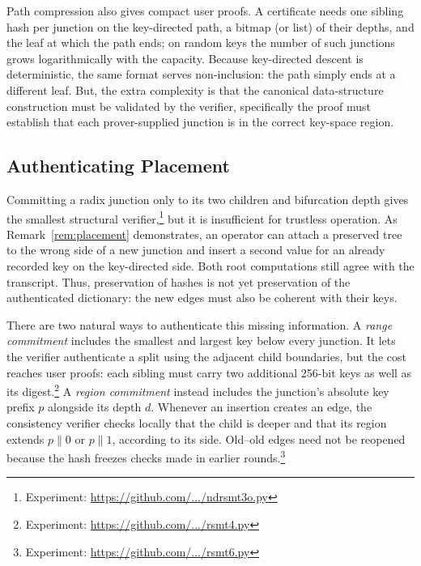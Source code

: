\documentclass[twocolumn]{article}
\begin{document}
Path compression also gives compact user proofs. A certificate needs one sibling hash per junction on the key-directed path, a bitmap (or list) of their depths, and the leaf at which the path ends; on random keys the number of such junctions grows logarithmically with the capacity. Because key-directed descent is deterministic, the same format serves non-inclusion: the path simply ends at a different leaf. But, the extra complexity is that the canonical data-structure construction must be validated by the verifier, specifically the proof must establish that each prover-supplied junction is in the correct key-space region.

\subsection{Authenticating Placement}

Committing a radix junction only to its two children and bifurcation depth gives the smallest structural verifier,\footnote{Experiment: \href{https://github.com/ristik/ndsmt-experiments/blob/main/ndrsmt3o.py}{https://github.com/.../ndrsmt3o.py}} but it is insufficient for trustless operation. As Remark~\ref{rem:placement} demonstrates, an operator can attach a preserved tree to the wrong side of a new junction and insert a second value for an already recorded key on the key-directed side. Both root computations still agree with the transcript. Thus, preservation of hashes is not yet preservation of the authenticated dictionary: the new edges must also be coherent with their keys.

There are two natural ways to authenticate this missing information. A \emph{range commitment} includes the smallest and largest key below every junction. It lets the verifier authenticate a split using the adjacent child boundaries, but the cost reaches user proofs: each sibling must carry two additional 256-bit keys as well as its digest.\footnote{Experiment: \href{https://github.com/ristik/ndsmt-experiments/blob/main/rsmt4.py}{https://github.com/.../rsmt4.py}}
A \emph{region commitment} instead includes the junction's absolute key prefix \(p\) alongside its depth \(d\). Whenever an insertion creates an edge, the consistency verifier checks locally that the child is deeper and that its region extends \(p\|0\) or \(p\|1\), according to its side. Old--old edges need not be reopened because the hash freezes checks made in earlier rounds.\footnote{Experiment: \href{https://github.com/ristik/ndsmt-experiments/blob/main/rsmt6.py}{https://github.com/.../rsmt6.py}}
\end{document}
